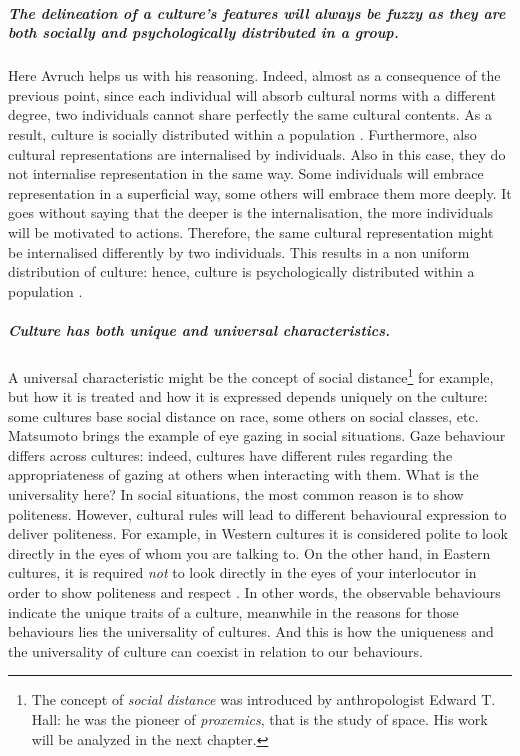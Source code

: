 \documentclass[../main.tex]{subfiles}
\begin{document}
\subparagraph*{The delineation of a culture's features will always be fuzzy as they are both socially and psychologically distributed in a group.} Here Avruch helps us with his reasoning. Indeed, almost as a consequence of the previous point, since each individual will absorb cultural norms with a different degree, two individuals cannot share perfectly the same cultural contents. As a result, culture is socially distributed within a population \autocite[18]{avruch}. Furthermore, also cultural representations are internalised by individuals. Also in this case, they do not internalise representation in the same way. Some individuals will embrace representation in a superficial way, some others will embrace them more deeply. It goes without saying that the deeper is the internalisation, the more individuals will be motivated to actions. Therefore, the same cultural representation might be internalised differently by two individuals. This results in a non uniform distribution of culture: hence, culture is psychologically distributed within a population \mancite\autocite[20]{avruch}.

\subparagraph*{Culture has both unique and universal characteristics.} A universal characteristic might be the concept of social distance\footnote{The concept of \textit{social distance} was introduced by anthropologist Edward T. Hall: he was the pioneer of \textit{proxemics}, that is the study of space. His work will be analyzed in the next chapter.} for example, but how it is treated and how it is expressed depends uniquely on the culture: some cultures base social distance on race, some others on social classes, etc. Matsumoto brings the example of eye gazing in social situations. Gaze behaviour differs across cultures: indeed, cultures have different rules regarding the appropriateness of gazing at others when interacting with them. What is the universality here? In social situations, the most common reason is to show politeness. However, cultural rules will lead to different behavioural expression to deliver politeness. For example, in Western cultures it is considered polite to look directly in the eyes of whom you are talking to. On the other hand, in Eastern cultures, it is required \textit{not} to look directly in the eyes of your interlocutor in order to show politeness and respect \autocite[21-22]{matsumoto}. In other words, the observable behaviours indicate the unique traits of a culture, meanwhile in the reasons for those behaviours lies the universality of cultures. And this is how the uniqueness and the universality of culture can coexist in relation to our behaviours.
\end{document}
